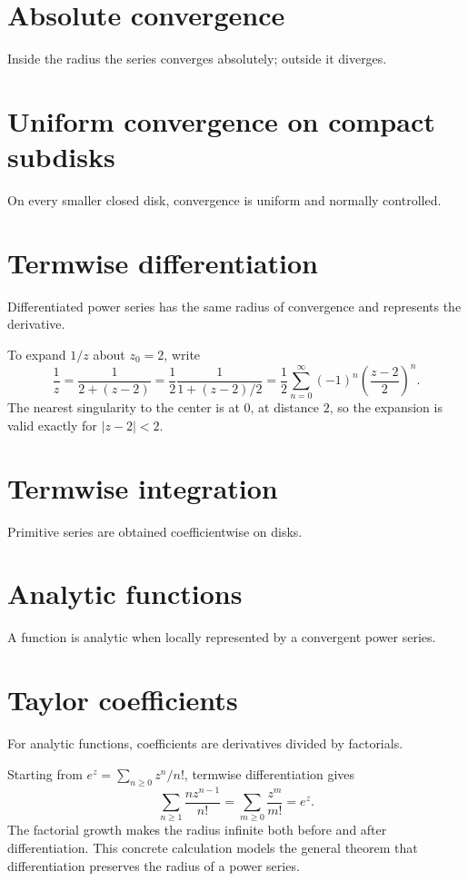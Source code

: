 \section{Absolute convergence}
Inside the radius the series converges absolutely; outside it diverges.

\section{Uniform convergence on compact subdisks}
On every smaller closed disk, convergence is uniform and normally controlled.

\section{Termwise differentiation}
Differentiated power series has the same radius of convergence and represents the derivative.

\begin{example}\label{ex:iv03-expand-02}
To expand \(1/z\) about \(z_0=2\), write
\[
\frac1z=\frac1{2+(z-2)}=\frac12\frac1{1+(z-2)/2}
=\frac12\sum_{n=0}^{\infty}(-1)^n\left(\frac{z-2}{2}\right)^n.
\]
The nearest singularity to the center is at \(0\), at distance \(2\), so the expansion is valid exactly for \(|z-2|<2\).
\end{example}
\section{Termwise integration}
Primitive series are obtained coefficientwise on disks.

\section{Analytic functions}
A function is analytic when locally represented by a convergent power series.

\section{Taylor coefficients}
For analytic functions, coefficients are derivatives divided by factorials.

\begin{example}\label{ex:iv03-expand-03}
Starting from \(e^z=\sum_{n\ge0}z^n/n!\), termwise differentiation gives
\[
\sum_{n\ge1}\frac{nz^{n-1}}{n!}=\sum_{m\ge0}\frac{z^m}{m!}=e^z.
\]
The factorial growth makes the radius infinite both before and after differentiation. This concrete calculation models the general theorem that differentiation preserves the radius of a power series.
\end{example}
